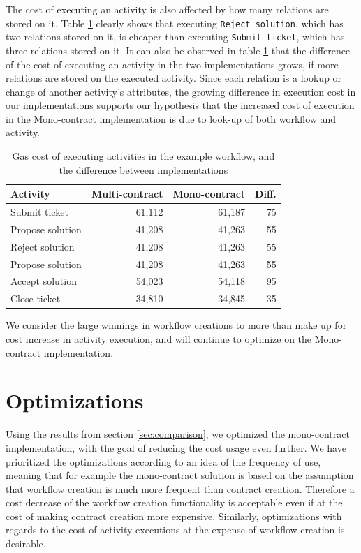 \documentclass{article}
\begin{document}
	The cost of executing an activity is also affected by how many relations are stored on it. 
	Table \ref{tab:cost-of-executing-activities} clearly shows that executing \texttt{Reject solution}, which has two relations stored on it, is cheaper than executing \texttt{Submit ticket}, which has three relations stored on it.
	It can also be observed in table \ref{tab:cost-of-executing-activities} that the difference of the cost of executing an activity in the two implementations grows, if more relations are stored on the executed activity.
	Since each relation is a lookup or change of another activity's attributes, the growing difference in execution cost in our implementations supports our hypothesis that the increased cost of execution in the Mono-contract implementation is due to look-up of both workflow and activity.

	\begin{table}[!ht]
		\centering
		\label{tab:cost-of-executing-activities}
		\begin{tabular}{| l | r | r | r |}
			\hline
			Activity          & Multi-contract 	& Mono-contract & Diff. 	\\\hline
			Submit ticket     & 61,112          & 61,187        & 75        \\\hline
			Propose solution  & 41,208          & 41,263        & 55        \\\hline
			Reject solution   & 41,208          & 41,263        & 55        \\\hline
			Propose solution  & 41,208          & 41,263        & 55        \\\hline
			Accept solution   & 54,023          & 54,118        & 95        \\\hline
			Close ticket      & 34,810          & 34,845        & 35        \\\hline
		\end{tabular}
		\caption{Gas cost of executing activities in the example workflow, and the difference between implementations}
	\end{table}

	We consider the large winnings in workflow creations to more than make up for cost increase in activity execution, and will continue to optimize on the Mono-contract implementation.

	\section{Optimizations}
		Using the results from section \ref{sec:comparison}, we optimized the mono-contract implementation, with the goal of reducing the cost usage even further.
		We have prioritized the optimizations according to an idea of the frequency of use, meaning that for example the mono-contract solution is based on the assumption that workflow creation is much more frequent than contract creation.
		Therefore a cost decrease of the workflow creation functionality is acceptable even if at the cost of making contract creation more expensive. 
		Similarly, optimizations with regards to the cost of activity executions at the expense of workflow creation is desirable.
\end{document}
